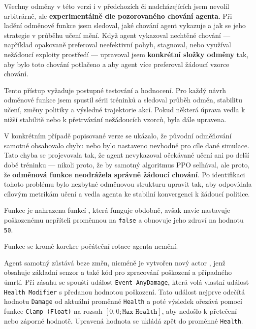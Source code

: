 Všechny odměny v této verzi i v předchozích či nadcházejících jsem nevolil arbitrárně, ale \textbf{experimentálně dle pozorovaného chování agenta}. Při ladění odměnové funkce jsem sledoval, jaké chování agent vykazuje a jak se jeho strategie v průběhu učení mění. Když agent vykazoval nechtěné chování — například opakovaně preferoval neefektivní pohyb, stagnoval, nebo využíval nežádoucí exploity prostředí — upravoval jsem \textbf{konkrétní složky odměny} tak, aby bylo toto chování potlačeno a aby agent více preferoval žádoucí vzorce chování.

\newpage

Tento přístup vyžaduje postupné testování a hodnocení. Pro každý návrh odměnové funkce jsem spustil sérii tréninků a sledoval průběh odměn, stabilitu učení, změny politiky a výsledné trajektorie akcí. Pokud některá úprava vedla k nižší stabilitě nebo k přetrvávání nežádoucích vzorců, byla dále upravena.

V konkrétním případě popisované verze se ukázalo, že původní odměňování samotné obsahovalo chybu nebo bylo nastaveno nevhodně pro cíle dané simulace. Tato chyba se projevovala tak, že agent nevykazoval očekávané učení ani po delší době tréninku — nikoli proto, že by samotný algoritmus PPO selhával, ale proto, že \textbf{odměnová funkce neodrážela správně žádoucí chování}. Po identifikaci tohoto problému bylo nezbytné odměnovou strukturu upravit tak, aby odpovídala cílovým metrikám učení a vedla agenta ke stabilní konvergenci k žádoucí politice.

Funkce  je nahrazena funkcí , která funguje obdobně, avšak navíc nastavuje poškozenému nepříteli proměnnou  na \texttt{false} a obnovuje jeho zdraví na hodnotu \texttt{50}.

Funkce  se kromě korekce počáteční rotace agenta nemění.

Agent samotný zůstává beze změn, nicméně je vytvořen nový actor , jenž obsahuje základní  senzor a také kód pro zpracování poškození a případného úmrtí. Při zásahu se spouští událost \texttt{Event AnyDamage}, která volá vlastní událost \texttt{Health Modifier} s předanou hodnotou poškození. Tato událost nejprve odečítá hodnotu \texttt{Damage} od aktuální proměnné \texttt{Health} a poté výsledek ořezává pomocí funkce \texttt{Clamp (Float)} na rozsah $[0{,}0; \texttt{Max Health}]$, aby nedošlo k přetečení nebo záporné hodnotě. Upravená hodnota se ukládá zpět do proměnné \texttt{Health}.

